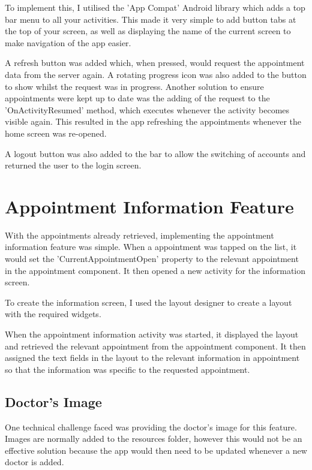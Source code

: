 To implement this, I utilised the 'App Compat' Android library which adds a top bar menu to all your activities. This made it very simple to add button tabs at the top of your screen, as well as displaying the name of the current screen to make navigation of the app easier.

A refresh button was added which, when pressed, would request the appointment data from the server again. A rotating progress icon was also added to the button to show whilst the request was in progress. Another solution to ensure appointments were kept up to date was the adding of the request to the 'OnActivityResumed' method, which executes whenever the activity becomes visible again. This resulted in the app refreshing the appointments whenever the home screen was re-opened.

A logout button was also added to the bar to allow the switching of accounts and returned the user to the login screen.

\section{Appointment Information Feature}

With the appointments already retrieved, implementing the appointment information feature was simple. When a appointment was tapped on the list, it would set the 'CurrentAppointmentOpen' property to the relevant appointment in the appointment component. It then opened a new activity for the information screen.

To create the information screen, I used the layout designer to create a layout with the required widgets.

When the appointment information activity was started, it displayed the layout and retrieved the relevant appointment from the appointment component. It then assigned the text fields in the layout to the relevant information in appointment so that the information was specific to the requested appointment.

\subsection{Doctor's Image}

One technical challenge faced was providing the doctor's image for this feature. Images are normally added to the resources folder, however this would not be an effective solution because the app would then need to be updated whenever a new doctor is added.

